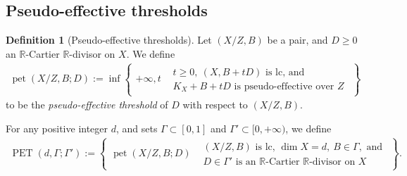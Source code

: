 \documentclass[11pt]{amsart}
\numberwithin{equation}{section}
\newcommand{\Rr}{\mathbb{R}}
\newcommand{\pet}{\operatorname{pet}}
\newcommand{\PET}{\operatorname{PET}}
\newcommand{\Ii}{{\Gamma}}
\theoremstyle{definition}
\theoremstyle{definition}
\newtheorem{defn}[thm]{Definition}
\begin{document}
\subsection{Pseudo-effective thresholds}

\begin{defn}[Pseudo-effective thresholds]
Let $(X/Z,B)$ be a pair, and $D\geq 0$ an $\Rr$-Cartier $\Rr$-divisor on $X$. We define
\begin{align*}
\pet(X/Z,B;D):=\inf\left\{\begin{array}{l|l}
+\infty,t& \begin{array}{l}
t\geq 0,\  (X,B+tD)\text{ is lc, and}\\ K_X+B+tD\text{ is pseudo-effective over }Z
\end{array}
\end{array}\right\}
\end{align*}
to be the \emph{pseudo-effective threshold} of $D$ with respect to $(X/Z,B)$. 

For any positive integer $d$, and sets $\Ii\subset [0,1]$ and $\Ii'\subset [0,+\infty)$, we define
\begin{align*}
\PET(d,\Ii;\Ii'):=\left\{\begin{array}{l|l}
\pet(X/Z,B;D)& \begin{array}{l}
(X/Z,B)\text{ is lc, }\dim X=d,\ B\in\Ii,\text{ and}\\
     D\in\Ii'\text{ is an }\Rr\text{-Cartier }\Rr\text{-divisor on }X
\end{array}
\end{array}\right\}.
\end{align*}
\end{defn}
\end{document}
